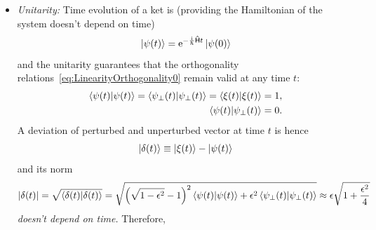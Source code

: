\documentclass[a4paper,11pt,twoside]{article}
\begin{document}
\begin{itemize}
            \item
                \emph{Unitarity:} Time evolution of a ket is (providing the Hamiltonian of the system doesn't depend on time)
                \begin{equation}
                    \left|{\psi(t)}\right\rangle=\operatorname{e}^{-\frac{\mathrm{i}}{\hbar}\mathsf{\hat{H}}t}\left|{\psi(0)}\right\rangle
                \end{equation}
                and the unitarity guarantees that the orthogonality relations~\eqref{eq:LinearityOrthogonality0} remain valid at any time $t$:
                \begin{align}
                    \left\langle{\psi(t)}\middle|{\psi(t)}\right\rangle=\left\langle{\psi_{\perp}(t)}\middle|{\psi_{\perp}(t)}\right\rangle=\left\langle{\xi(t)}\middle|{\xi(t)}\right\rangle=1,\nonumber\\
                    \label{eq:LinearityOrthogonality}
                    \left\langle{\psi(t)}\middle|{\psi_{\perp}(t)}\right\rangle=0.
                \end{align}
                A deviation of perturbed and unperturbed vector at time $t$ is hence
                \begin{equation}
                    \left|{\delta(t)}\right\rangle\equiv\left|{\xi(t)}\right\rangle-\left|{\psi(t)}\right\rangle
                \end{equation}
                and its norm
                \begin{equation}
                    \left|{\delta(t)}\right|
                        =\sqrt{\left\langle{\delta(t)}\middle|{\delta(t)}\right\rangle}
                        =\sqrt{\left(\sqrt{1-\epsilon^{2}}-1\right)^{2}\left\langle{\psi(t)}\middle|{\psi(t)}\right\rangle+\epsilon^{2}\left\langle{\psi_{\perp}(t)}\middle|{\psi_{\perp}(t)}\right\rangle}
                        \approx\epsilon\sqrt{1+\frac{\epsilon^{2}}{4}}
                \end{equation}
                \emph{doesn't depend on time.}
                Therefore, 
        \end{itemize}
\end{document}
